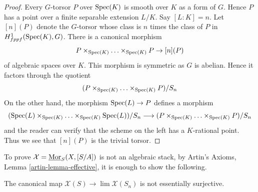 \begin{proof}
Every $G$-torsor $P$ over $\mathop{\mathrm{Spec}}(K)$ is smooth over $K$ as a form of $G$.
Hence $P$ has a point over a finite separable extension $L/K$.
Say $[L : K] = n$. Let $[n](P)$ denote the $G$-torsor whose class is $n$
times the class of $P$ in $H^1_{fppf}(\mathop{\mathrm{Spec}}(K), G)$. There is a canonical
morphism
$$
P \times_{\mathop{\mathrm{Spec}}(K)} \ldots \times_{\mathop{\mathrm{Spec}}(K)} P \to [n](P)
$$
of algebraic spaces over $K$. This morphism is symmetric as
$G$ is abelian. Hence it factors through the quotient
$$
(P \times_{\mathop{\mathrm{Spec}}(K)} \ldots \times_{\mathop{\mathrm{Spec}}(K)} P)/S_n
$$
On the other hand, the morphism $\mathop{\mathrm{Spec}}(L) \to P$ defines a morphism
$$
(\mathop{\mathrm{Spec}}(L) \times_{\mathop{\mathrm{Spec}}(K)} \ldots \times_{\mathop{\mathrm{Spec}}(K)} \mathop{\mathrm{Spec}}(L))/S_n
\longrightarrow (P \times_{\mathop{\mathrm{Spec}}(K)} \ldots \times_{\mathop{\mathrm{Spec}}(K)} P)/S_n
$$
and the reader can verify that the scheme on the left has a $K$-rational
point. Thus we see that $[n](P)$ is the trivial torsor.
\end{proof}

\noindent
To prove $\mathcal{X} = \underline{\mathop{\mathrm{Mor}}\nolimits}_S(X, [S/A])$
is not an algebraic stack, by
Artin's Axioms, Lemma \ref{artin-lemma-effective},
it is enough to show the following.

\begin{lemma}
\label{lemma-not-essentially-surjective}
The canonical map $\mathcal{X}(S) \to \lim \mathcal{X}(S_n)$
is not essentially surjective.
\end{lemma}


